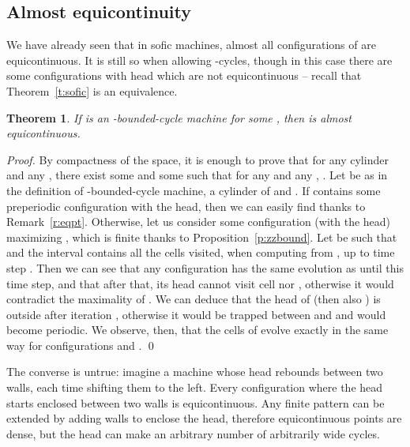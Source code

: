 \documentclass{llncs}
\newtheorem{teo}{Theorem}
\begin{document}
\subsection{Almost equicontinuity}
We have already seen that in sofic machines, almost all configurations of  are equicontinuous.
It is still so when allowing -cycles, though in this case there are some configurations with head which are not equicontinuous -- recall that Theorem~\ref{t:sofic} is an equivalence.
\begin{teo}
 If  is an -bounded-cycle machine for some , then  is almost equicontinuous.
\end{teo}
\begin{proof}
 By compactness of the space, it is enough to prove that for any cylinder  and any , there exist some  and some  such that for any  and any , .
Let  be as in the definition of -bounded-cycle machine,  a cylinder of  and .
If  contains some preperiodic configuration with the head, then we can easily find  thanks to Remark~\ref{r:eqpt}.
 Otherwise, let us consider some configuration  (with the head) maximizing , which is finite thanks to Proposition~\ref{p:zzbound}.
 Let  be such that  and the interval  contains all the cells visited, when computing from , up to time step .
 Then we can see that any configuration  has the same evolution as  until this time step, and that after that, its head cannot visit cell  nor , otherwise it would contradict the maximality of .
 We can deduce that the head of  (then also ) is outside  after iteration , otherwise it would be trapped between  and  and would become periodic.
 We observe, then, that the cells of  evolve exactly in the same way for configurations  and .
\qed\end{proof}
The converse is untrue: imagine a machine whose head rebounds between two walls, each time shifting them to the left.
Every configuration where the head starts enclosed between two walls is equicontinuous.
Any finite pattern can be extended by adding walls to enclose the head, therefore equicontinuous points are dense, but the head can make an arbitrary number of arbitrarily wide cycles.
\end{document}
